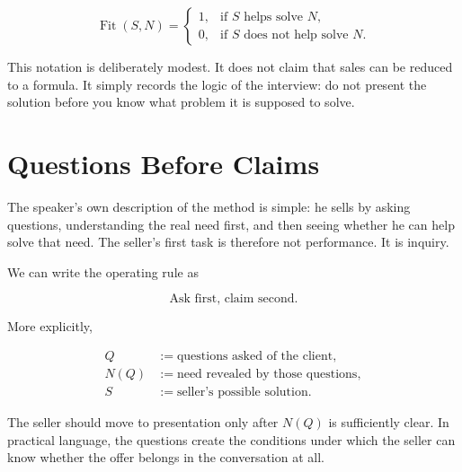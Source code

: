 \begin{equation}
\operatorname{Fit}(S,N)=
\begin{cases}
1, & \text{if } S \text{ helps solve } N,\\
0, & \text{if } S \text{ does not help solve } N.
\end{cases}
\end{equation}

This notation is deliberately modest. It does not claim that sales can be reduced to a formula. It simply records the logic of the interview: do not present the solution before you know what problem it is supposed to solve.

\section{Questions Before Claims}

The speaker's own description of the method is simple: he sells by asking questions, understanding the real need first, and then seeing whether he can help solve that need. The seller's first task is therefore not performance. It is inquiry.

We can write the operating rule as

\begin{equation}
\text{Ask first, claim second.}
\end{equation}

More explicitly,

\begin{align}
Q &:= \text{questions asked of the client},\\
N(Q) &:= \text{need revealed by those questions},\\
S &:= \text{seller's possible solution}.
\end{align}

The seller should move to presentation only after \(N(Q)\) is sufficiently clear. In practical language, the questions create the conditions under which the seller can know whether the offer belongs in the conversation at all.

